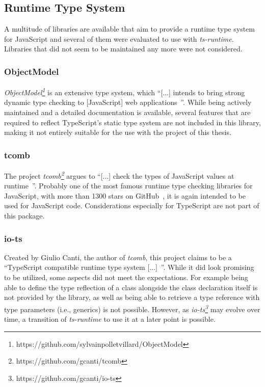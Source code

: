\subsection{Runtime Type System}

A multitude of libraries are available that aim to provide a runtime type system for JavaScript and several of them were evaluated to use with \emph{ts-runtime}. Libraries that did not seem to be maintained any more were not considered.

\subsubsection{ObjectModel}

\emph{ObjectModel\footnote{https://github.com/sylvainpolletvillard/ObjectModel}} is an extensive type system, which ``[...] intends to bring strong dynamic type checking to [JavaScript] web applications~\cite{RuntimeTypeSystem:ObjectModel}''. While being actively maintained and a detailed documentation is available, several features that are required to reflect TypeScript's static type system are not included in this library, making it not entirely suitable for the use with the project of this thesis.

\subsubsection{tcomb}

The project \emph{tcomb\footnote{https://github.com/gcanti/tcomb}} argues to ``[...] check the types of JavaScript values at runtime~\cite{RuntimeTypeSystem:tcomb}''. Probably one of the most famous runtime type checking libraries for JavaScript, with more than 1300 stars on GitHub~\cite{RuntimeTypeSystem:tcomb}, it is again intended to be used for JavaScript code. Considerations especially for TypeScript are not part of this package.

\subsubsection{io-ts}

Created by Giulio Canti, the author of \emph{tcomb}, this project claims to be a ``TypeScript compatible runtime type system [...]~\cite{RuntimeTypeSystem:io-ts}''. While it did look promising to be utilized, some aspects did not meet the expectations. For example being able to define the type reflection of a class alongside the class declaration itself is not provided by the library, as well as being able to retrieve a type reference with type parameters (i.e., generics) is not possible. However, as \emph{io-ts\footnote{https://github.com/gcanti/io-ts}} may evolve over time, a transition of \emph{ts-runtime} to use it at a later point is possible.

